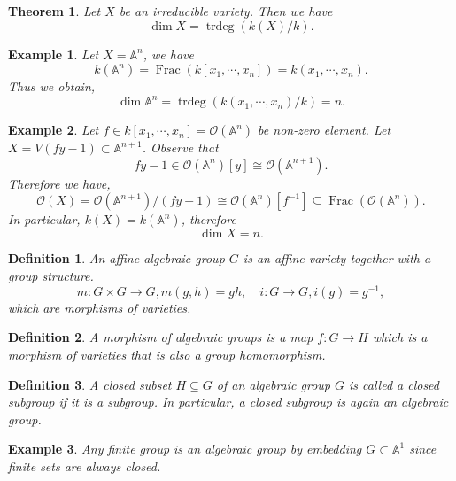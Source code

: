 \documentclass[10pt]{article}
\newtheorem{theorem}{Theorem} [section]
\newtheorem{definition}{Definition}[section]
\newtheorem{example}{Example}[section]
\numberwithin{equation}{theorem}
\DeclareMathOperator{\trdeg}{trdeg}
\DeclareMathOperator{\Frac}{Frac}
\newcommand{\A}[0]{\mathbb{A}}
\begin{document}
\begin{theorem}
  Let $X$ be an irreducible variety. Then we have
  \begin{equation*}
  \dim X = \trdeg(k(X)/k).
  \end{equation*}
\end{theorem}
\begin{example}
  Let $X=\A^n$, we have 
  \begin{equation*}
    k(\A^n) = \Frac(k[x_1,\cdots,x_n])=k(x_1,\cdots,x_n).
  \end{equation*}
  Thus we obtain,
  \begin{equation*}
    \dim\A^n = \trdeg(k(x_1,\cdots,x_n)/k) = n.
  \end{equation*}
\end{example}
\begin{example}
  Let $f\in k[x_1,\cdots,x_n]=\mathcal{O}(\A^n)$ be non-zero element. Let $X=V(fy-1)\subset\A^{n+1}$. Observe that
  \begin{equation*}
    fy-1 \in\mathcal{O}(\A^n)[y] \cong\mathcal{O}(\A^{n+1}).
  \end{equation*}
  Therefore we have,
  \begin{equation*}
    \mathcal{O}(X) = \mathcal{O}(\A^{n+1})/(fy-1) \cong\mathcal{O}(\A^n)[f^{-1}]\subseteq\Frac(\mathcal{O}(\A^n)).
  \end{equation*}
  In particular, $k(X)=k(\A^n)$, therefore
  \begin{equation*}
    \dim X = n.
  \end{equation*}
\end{example}
\begin{definition}
An affine algebraic group $G$ is an affine variety together with a group structure.
\begin{equation*}
m:G\times G\to G, m(g,h)=gh,\quad i:G\to G, i(g) = g^{-1},
\end{equation*}
which are morphisms of varieties.
\end{definition}
\begin{definition}
  A morphism of algebraic groups is a map $f:G\to H$ which is a morphism of varieties that is also a group homomorphism.
\end{definition}
\begin{definition}
A closed subset $H\subseteq G$ of an algebraic group $G$ is called a closed subgroup if it is a subgroup. In particular, a closed subgroup is again an algebraic group.
\end{definition}
\begin{example}
Any finite group is an algebraic group by embedding $G\subset\A^1$ since finite sets are always closed.
\end{example}
\end{document}
